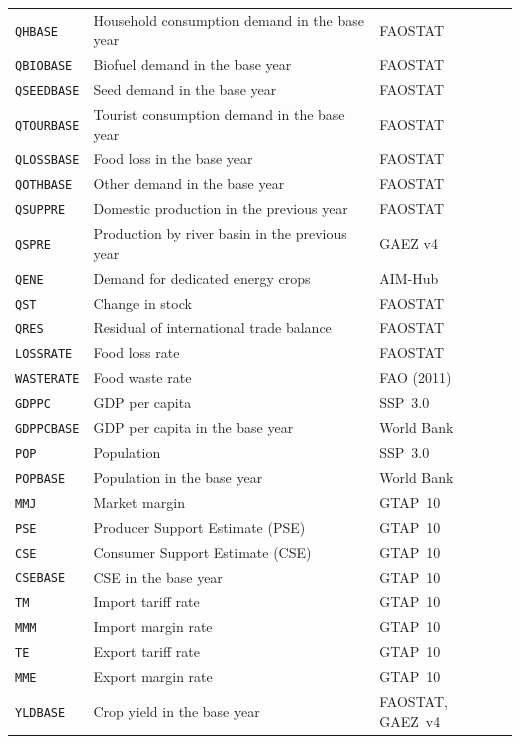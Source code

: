 \begin{xltabular}{\linewidth}{l X l}
  \texttt{QHBASE} & Household consumption demand in the base year & FAOSTAT \\
  \texttt{QBIOBASE} & Biofuel demand in the base year & FAOSTAT \\
  \texttt{QSEEDBASE} & Seed demand in the base year & FAOSTAT \\
  \texttt{QTOURBASE} & Tourist consumption demand in the base year & FAOSTAT \\
  \texttt{QLOSSBASE} & Food loss in the base year & FAOSTAT \\
  \texttt{QOTHBASE} & Other demand in the base year & FAOSTAT \\
  \texttt{QSUPPRE} & Domestic production in the previous year & FAOSTAT \\
  \texttt{QSPRE} & Production by river basin in the previous year & GAEZ v4 \\
  \texttt{QENE} & Demand for dedicated energy crops & AIM-Hub \\
  \texttt{QST} & Change in stock & FAOSTAT \\
  \texttt{QRES} & Residual of international trade balance & FAOSTAT \\
  \texttt{LOSSRATE} & Food loss rate & FAOSTAT \\
  \texttt{WASTERATE} & Food waste rate & FAO (2011) \\
  \texttt{GDPPC} & GDP per capita & SSP~3.0~\cite{crespocuaresmaIncomeProjectionsClimate2017} \\
  \texttt{GDPPCBASE} & GDP per capita in the base year & World Bank \\
  \texttt{POP} & Population & SSP~3.0~\cite{kcWittgensteinCenterWIC2024} \\
  \texttt{POPBASE} & Population in the base year & World Bank \\
  \texttt{MMJ} & Market margin & GTAP~10 \\
  \texttt{PSE} & Producer Support Estimate (PSE) & GTAP~10 \\
  \texttt{CSE} & Consumer Support Estimate (CSE) & GTAP~10 \\
  \texttt{CSEBASE} & CSE in the base year & GTAP~10 \\
  \texttt{TM} & Import tariff rate & GTAP~10 \\
  \texttt{MMM} & Import margin rate & GTAP~10 \\
  \texttt{TE} & Export tariff rate & GTAP~10 \\
  \texttt{MME} & Export margin rate & GTAP~10 \\
  \texttt{YLDBASE} & Crop yield in the base year & FAOSTAT, GAEZ~v4 \\

\end{xltabular}
